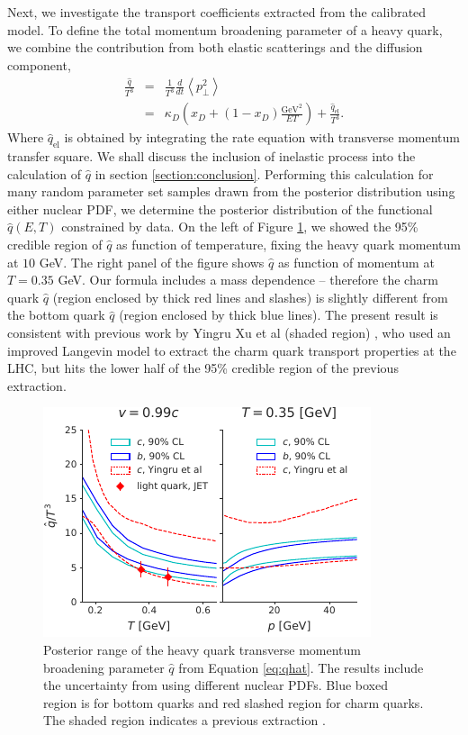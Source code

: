 \documentclass[aps, prc, reprint, amsmath, groupedaddress, nofootinbib]{revtex4-1}
\begin{document}
Next, we investigate the transport coefficients extracted from the calibrated model.
To define the total momentum broadening parameter of a heavy quark,
we combine the contribution from both elastic scatterings and the diffusion component,
\begin{eqnarray}\label{eq:qhat}
\frac{\hat{q}}{T^3} &=& \frac{1}{T^3}\frac{d}{dt}\left\langle p_\perp^2 \right\rangle\\
\nonumber
 &=&  \kappa_D\left(x_D + (1-x_D)\frac{\textrm{GeV}^2}{ET}\right) + \frac{\hat{q}_{\textrm{el}}}{T^3}.
\end{eqnarray}
Where $\hat{q}_{\textrm{el}}$ is obtained by integrating the rate equation with transverse momentum transfer square.
We shall discuss the inclusion of inelastic process into the calculation of $\hat{q}$ in section \ref{section:conclusion}.
Performing this calculation for many random parameter set samples drawn from the posterior distribution using either nuclear PDF, we determine the posterior distribution of the functional $\hat{q}(E, T)$ constrained by data.
On the left of Figure \ref{plots:posterior_qhat}, we showed the 95\% credible region of $\hat{q}$ as function of temperature, fixing the heavy quark momentum at $10$ GeV.
The right panel of the figure shows $\hat{q}$ as function of momentum at $T=0.35$ GeV.
Our formula includes a mass dependence -- therefore  the charm quark $\hat{q}$ (region enclosed by thick red lines and slashes) is slightly different from the bottom quark $\hat{q}$ (region enclosed by thick blue lines).
The present result is consistent with previous work by Yingru Xu et al (shaded region) \cite{Xu:2017obm}, who used an improved Langevin model to extract the charm quark transport properties at the LHC,  but hits the lower half of the 95\% credible region of the previous extraction.
\begin{figure}
\includegraphics[width=\columnwidth]{qhat_p_T.pdf}
\caption{Posterior range of the heavy quark transverse momentum broadening parameter $\hat{q}$ from Equation \ref{eq:qhat}. The results include the uncertainty from using different nuclear PDFs. Blue boxed region is for bottom quarks and red slashed region for charm quarks. The shaded region indicates a previous extraction \cite{Xu:2017obm}.}\label{plots:posterior_qhat}
\end{figure}
\end{document}
